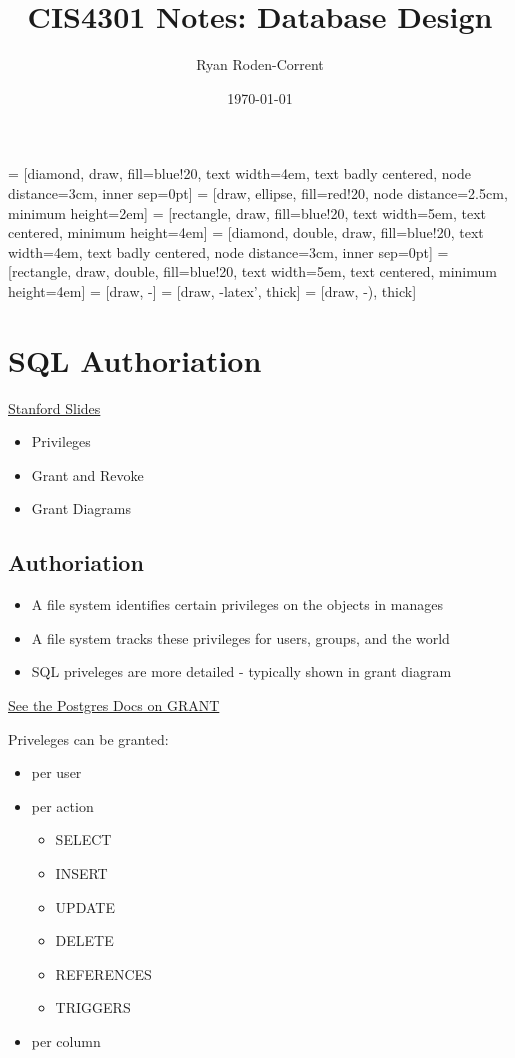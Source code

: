 \documentclass[12pt]{article}
\title{CIS4301 Notes: Database Design}
\author{Ryan Roden-Corrent}
\date{\today}
\begin{document}
\setlength\parindent{0pt}
 = [diamond, draw, fill=blue!20, text width=4em,
  text badly centered, node distance=3cm, inner sep=0pt]
 = [draw, ellipse, fill=red!20, node distance=2.5cm,
  minimum height=2em]
 = [rectangle, draw, fill=blue!20, text width=5em,
  text centered, minimum height=4em]
 = [diamond, double, draw, fill=blue!20, text width=4em,
  text badly centered, node distance=3cm, inner sep=0pt]
 = [rectangle, draw, double, fill=blue!20, text width=5em,
  text centered, minimum height=4em]
 = [draw, -]
 = [draw, -latex', thick]
 = [draw, -), thick]
\maketitle
\section{SQL Authoriation}
\href{http://infolab.stanford.edu/~ullman/fcdb/aut07/}{Stanford Slides}
\begin{itemize}
  \item {Privileges}
  \item {Grant and Revoke}
  \item {Grant Diagrams}
\end{itemize}

\subsection{Authoriation}
\begin{itemize}
  \item {A file system identifies certain privileges on the objects in manages}
  \item {A file system tracks these privileges for users, groups, and the world}
  \item {SQL priveleges are more detailed - typically shown in grant diagram}
\end{itemize}

\href{http://www.postgresql.org/docs/9.2/static/sql-grant.html}
{See the Postgres Docs on GRANT}

Priveleges can be granted:
\begin{itemize}
  \item {per user}
  \item {per action
      \begin{itemize}
        \item {SELECT}
        \item {INSERT}
        \item {UPDATE}
        \item {DELETE}
        \item {REFERENCES}
        \item {TRIGGERS}
      \end{itemize}
    }
  \item {per column}
\end{itemize}
\end{document}
